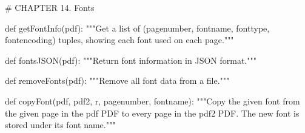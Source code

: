 # CHAPTER 14. Fonts

def getFontInfo(pdf):
    """Get a list of (pagenumber, fontname, fonttype, fontencoding) tuples,
    showing each font used on each page."""

def fontsJSON(pdf):
    """Return font information in JSON format."""

def removeFonts(pdf):
    """Remove all font data from a file."""

def copyFont(pdf, pdf2, r, pagenumber, fontname):
    """Copy the given font from the given page in the pdf PDF to every page in
    the pdf2 PDF. The new font is stored under its font name."""
